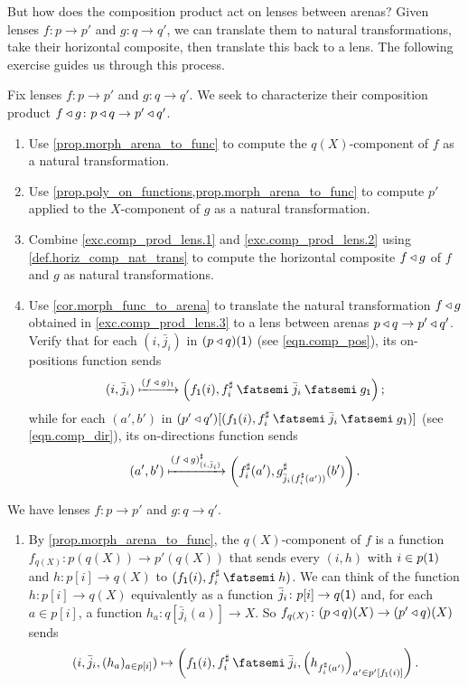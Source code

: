 \documentclass[Book-Poly]{subfiles}
\begin{document}
But how does the composition product act on lenses between arenas?
Given lenses $f\colon p\to p'$ and $g\colon q\to q'$, we can translate them to natural transformations, take their horizontal composite, then translate this back to a lens.
The following exercise guides us through this process.

\begin{exercise} \label{exc.comp_prod_lens}
Fix lenses $f\colon p\to p'$ and $g\colon q\to q'$.
We seek to characterize their composition product $f\mathbin{\triangleleft} g\colon p\mathbin{\triangleleft} q\to p'\mathbin{\triangleleft} q'$.
\begin{enumerate}
    \item\label{exc.comp_prod_lens.1} Use \cref{prop.morph_arena_to_func} to compute the $q(X)$-component of $f$ as a natural transformation.
    \item\label{exc.comp_prod_lens.2} Use \cref{prop.poly_on_functions,prop.morph_arena_to_func} to compute $p'$ applied to the $X$-component of $g$ as a natural transformation.
    \item\label{exc.comp_prod_lens.3} Combine \cref{exc.comp_prod_lens.1} and \cref{exc.comp_prod_lens.2} using \cref{def.horiz_comp_nat_trans} to compute the horizontal composite $f\mathbin{\triangleleft} g$ of $f$ and $g$ as natural transformations.
    \item Use \cref{cor.morph_func_to_arena} to translate the natural transformation $f\mathbin{\triangleleft} g$ obtained in \cref{exc.comp_prod_lens.3} to a lens between arenas $p\mathbin{\triangleleft} q\to p'\mathbin{\triangleleft} q'$.
    Verify that for each $(i,\bar{j}_i)$ in $(p\mathbin{\triangleleft} q)(\textsf{1})$ (see \eqref{eqn.comp_pos}), its on-positions function sends
    \begin{equation} \label{eqn.comp_lens_pos}
        (i,\bar{j}_i)\Mapsto{(f\:\tri\:g)_\1}\left(f_\1(i), f^\sharp_i\then\bar{j}_i\then g_\1\right);
    \end{equation}
    while for each $(a',b')$ in $(p'\tri q')[(f_\1(i), f^\sharp_i\then\bar{j}_i\then g_\1)]$ (see \eqref{eqn.comp_dir}), its on-directions function sends
    \begin{equation} \label{eqn.comp_lens_dir}
        (a',b')\xmapsto{(f\:\mathbin{\triangleleft}\:g)^\sharp_{(i,\bar{j}_i)}}\left(f^\sharp_i(a'), g^\sharp_{\bar{j}_i(f^\sharp_i(a'))}(b')\right).
    \end{equation}
    \qedhere
\end{enumerate}
\begin{solution}
We have lenses $f\colon p\to p'$ and $g\colon q\to q'$.
\begin{enumerate}
    \item By \cref{prop.morph_arena_to_func}, the $q(X)$-component of $f$ is a function $f_{q(X)}\colon p(q(X))\to p'(q(X))$ that sends every $(i,h)$ with $i\in p(\textsf{1})$ and $h\colon p[i]\to q(X)$ to $(f_\1(i),f^\sharp_i\then h)$.
    We can think of the function $h\colon p[i]\to q(X)$ equivalently as a function $\bar{j}_i\colon p[i]\to q(\textsf{1})$ and, for each $a\in p[i]$, a function $h_a\colon q[\bar{j}_i(a)]\to X$.
    So $f_{q(X)}\colon (p\mathbin{\triangleleft} q)(X)\to (p'\mathbin{\triangleleft} q)(X)$ sends \[(i,\bar{j}_i,(h_a)_{a\in p[i]})\mapsto\left(f_\1(i),f^\sharp_i\then\bar{j}_i,\left(h_{f^\sharp_i(a')}\right)_{a'\in p'[f_\1(i)]}\right).\]
    

\end{enumerate}
\end{solution}
\end{exercise}
\end{document}
